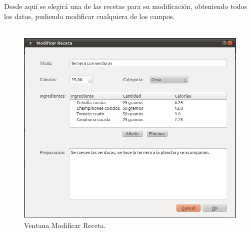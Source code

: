 \begin{enumerate}
Desde aquí se elegirá una de las recetas para su modificación, obteniendo todos los datos, pudiendo modificar cualquiera de los campos.\\\\
\begin{figure}[H]
  \label{modificar_receta}
  \begin{center}
    \includegraphics[scale=0.5]{../../Image/receta-modificar2.png}
  \end{center}
  \caption{Ventana Modificar Receta.}
\end{figure}


\end{enumerate}
